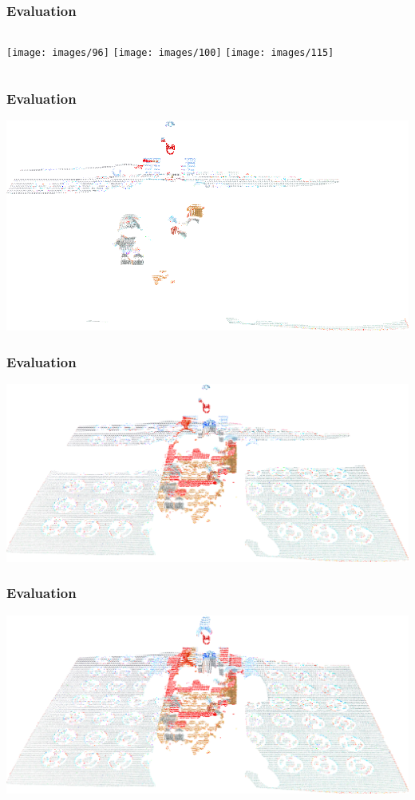 \documentclass[aspectratio=169]{beamer}
\begin{document}
\begin{frame}
    \frametitle{Evaluation}

    \begin{columns}
        \texttt{[image: images/96]}
        \texttt{[image: images/100]}
        \texttt{[image: images/115]}
    \end{columns}
\end{frame}

\begin{frame}
    \frametitle{Evaluation}

    \includegraphics[width=\linewidth,height=\textheight,keepaspectratio]{../thesis/images/lego/126}
\end{frame}

\begin{frame}
    \frametitle{Evaluation}

    \includegraphics[width=\linewidth,height=\textheight,keepaspectratio]{../thesis/images/lego/150}
\end{frame}

\begin{frame}
    \frametitle{Evaluation}

    \includegraphics[width=\linewidth,height=\textheight,keepaspectratio]{../thesis/images/lego/170}
\end{frame}
\end{document}
